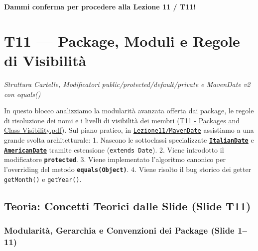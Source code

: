 \documentclass[11pt,a4paper,oneside]{report}
\newcommand{\passthrough}[1]{#1}
\begin{document}
\textbf{Dammi conferma per procedere alla Lezione 11 / T11!}

\newpage
\chapter[T11 --- Package, Moduli e Regole di Visibil]{T11 --- Package, Moduli e Regole di Visibilità}
\label{chap:t11}

{\small\sffamily\color{accentblue!80!black}\textit{Struttura Cartelle, Modificatori public/protected/default/private e MavenDate v2 con equals()}}

\vspace{0.8em}

In questo blocco analizziamo la modularità avanzata offerta dai package,
le regole di risoluzione dei nomi e i livelli di visibilità dei membri
(\href{file:///home/wally/Documenti/GitHub/Programmazione-II/25-26/Teoria-e-Esercitazioni/Slides-20260902/T11\%20-\%20Packages\%20and\%20Class\%20Visibility.pdf}{T11
- Packages and Class Visibility.pdf}). Sul piano pratico, in
\href{file:///home/wally/Documenti/GitHub/Programmazione-II/25-26/Teoria-e-Esercitazioni/Codice-20260902/Lezione11/MavenDate}{\passthrough{\lstinline!Lezione11/MavenDate!}}
assistiamo a una grande svolta architetturale: 1. Nascono le sottoclassi
specializzate
\textbf{\href{file:///home/wally/Documenti/GitHub/Programmazione-II/25-26/Teoria-e-Esercitazioni/Codice-20260902/Lezione11/MavenDate/src/main/java/it/oop/core/ItalianDate.java}{\passthrough{\lstinline!ItalianDate!}}}
e
\textbf{\href{file:///home/wally/Documenti/GitHub/Programmazione-II/25-26/Teoria-e-Esercitazioni/Codice-20260902/Lezione11/MavenDate/src/main/java/it/oop/core/AmericanDate.java}{\passthrough{\lstinline!AmericanDate!}}}
tramite estensione (\passthrough{\lstinline!extends Date!}). 2. Viene
introdotto il modificatore \textbf{\passthrough{\lstinline!protected!}}.
3. Viene implementato l'algoritmo canonico per l'overriding del metodo
\textbf{\passthrough{\lstinline!equals(Object)!}}. 4. Viene risolto il
bug storico dei getter \passthrough{\lstinline!getMonth()!} e
\passthrough{\lstinline!getYear()!}.

\section{Teoria: Concetti Teorici dalle Slide (Slide
T11)}\label{chap10_teoria-concetti-teorici-dalle-slide-slide-t11}

\subsection{Modularità, Gerarchia e Convenzioni dei Package (Slide
1--11)}\label{chap10_modularituxe0-gerarchia-e-convenzioni-dei-package-slide-111}
\end{document}
